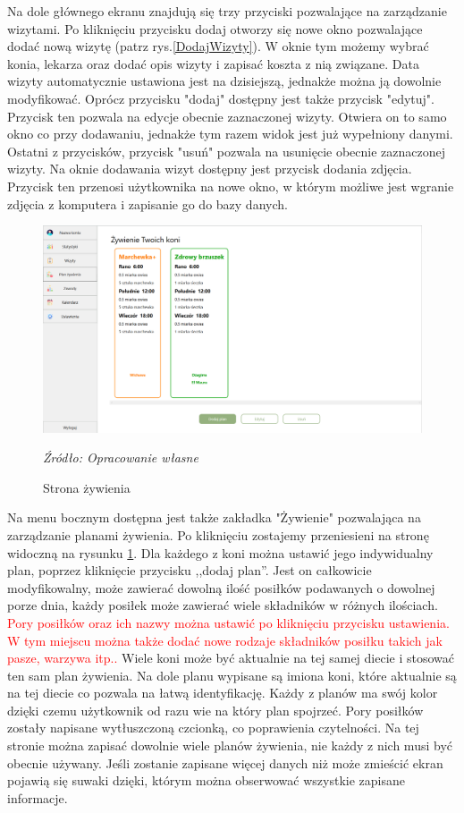 \documentclass[12pt,oneside]{report}
\begin{document}
Na dole głównego ekranu znajdują się trzy przyciski pozwalające na zarządzanie wizytami. Po kliknięciu przycisku dodaj otworzy się nowe okno pozwalające dodać nową wizytę (patrz rys.\ref{DodajWizyty}). W oknie tym możemy wybrać konia, lekarza oraz dodać opis wizyty i zapisać koszta z nią związane. Data wizyty automatycznie ustawiona jest na dzisiejszą, jednakże można ją dowolnie modyfikować. Oprócz przycisku "dodaj" dostępny jest także przycisk "edytuj". Przycisk ten pozwala na edycje obecnie zaznaczonej wizyty. Otwiera on to samo okno co przy dodawaniu, jednakże tym razem widok jest już wypełniony danymi. Ostatni z przycisków, przycisk "usuń" pozwala na usunięcie obecnie zaznaczonej wizyty. Na oknie dodawania wizyt dostępny jest przycisk dodania zdjęcia. Przycisk ten przenosi użytkownika na nowe okno, w którym możliwe jest wgranie zdjęcia z komputera i zapisanie go do bazy danych.

\begin{figure}[h]
	\centering
	\includegraphics[scale=0.4]{Zywienie}
	\caption{Strona żywienia}
	\textit{Źródło: Opracowanie własne}
	\label{Zywienie}
\end{figure}

Na menu bocznym dostępna jest także zakładka "Żywienie" pozwalająca na zarządzanie planami żywienia. Po kliknięciu zostajemy przeniesieni na stronę widoczną na rysunku \ref{Zywienie}. Dla każdego z koni można ustawić jego indywidualny plan, poprzez kliknięcie przycisku ,,dodaj plan''. Jest on całkowicie modyfikowalny, może zawierać dowolną ilość posiłków podawanych o dowolnej porze dnia, każdy posiłek może zawierać wiele składników w różnych ilościach. \textcolor{red}{Pory posiłków oraz ich nazwy można ustawić po kliknięciu przycisku ustawienia. W tym miejscu można także dodać nowe rodzaje składników posiłku takich jak pasze, warzywa itp..} Wiele koni może być aktualnie na tej samej diecie i stosować ten sam plan żywienia. Na dole planu wypisane są imiona koni, które aktualnie są na tej diecie co pozwala na łatwą identyfikację. Każdy z planów ma swój kolor dzięki czemu użytkownik od razu wie na który plan spojrzeć. Pory posiłków zostały napisane wytłuszczoną czcionką, co poprawienia czytelności. Na tej stronie można zapisać dowolnie wiele planów żywienia, nie każdy z nich musi być obecnie używany. Jeśli zostanie zapisane więcej danych niż może zmieścić ekran pojawią się suwaki dzięki, którym można obserwować wszystkie zapisane informacje.
\end{document}

